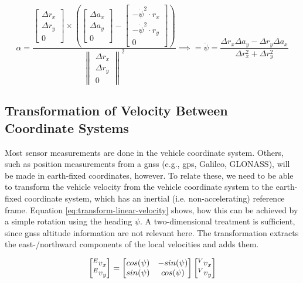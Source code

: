 \begin{equation}\label{eq:angacc-from-linacc-2d}%
\alpha%
= \frac{\begin{bmatrix}\Delta r_x \\ \Delta r_y \\ 0\end{bmatrix} \times \left(\begin{bmatrix}\Delta a_x \\ \Delta a_y \\ 0\end{bmatrix} - \begin{bmatrix}-\dot{\psi}^2 \cdot r_x \\ -\dot{\psi}^2 \cdot r_y \\ 0\end{bmatrix}\right)}{\begin{Vmatrix}\Delta r_x \\ \Delta r_y \\ 0\end{Vmatrix}^2}%
\implies =\ddot{\psi} = \frac{\Delta r_x\Delta a_y - \Delta r_y\Delta a_x}{\Delta r_x^2 + \Delta r_y^2}%
\end{equation}


\subsection{Transformation of Velocity Between Coordinate Systems}
Most sensor measurements are done in the vehicle coordinate system. Others, such as position measurements from a \gls{gnss} (e.g., \gls{gps}, Galileo, GLONASS), will be made in earth-fixed coordinates, however. To relate these, we need to be able to transform the vehicle velocity from the vehicle coordinate system to the earth-fixed coordinate system, which has an inertial (i.e. non-accelerating) reference frame. Equation \ref{eq:transform-linear-velocity} shows, how this can be achieved by a simple rotation using the heading $\psi$. A two-dimensional treatment is sufficient, since \gls{gnss} altitude information are not relevant here. The transformation extracts the east-/northward components of the local velocities and adds them.

\begin{equation}\label{eq:transform-linear-velocity}%
\begin{bmatrix}\prescript{E}{}{v}_x \\ \prescript{E}{}{v}_y\end{bmatrix}%
=\begin{bmatrix}cos(\psi) & -sin(\psi) \\ sin(\psi) & cos(\psi)\end{bmatrix}%
\begin{bmatrix}\prescript{V}{}{v}_x \\ \prescript{V}{}{v}_y\end{bmatrix}%
\end{equation}


